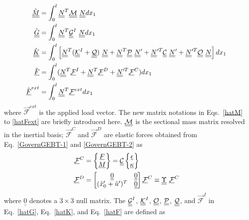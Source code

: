 \begin{align}
	\label{hatM} 
	\hat{\underline{\underline{M}}}&= \int_0^l \underline{\underline{N}}^T \mathcal{\underline{\underline{M}}} ~\underline{\underline{N}} dx_1 \\
	\label{hatG}
	\hat{\underline{\underline{G}}} &= \int_0^l \underline{\underline{N}}^T \underline{\underline{\mathcal{G}}}^I~\underline{\underline{N}} dx_1\\ 
	\label{hatK}
	\hat{\underline{\underline{K}}}&=\int_0^l \left[ \underline{\underline{N}}^T (\underline{\underline{\mathcal{K}}}^I + \mathcal{\underline{\underline{Q}}})~ \underline{\underline{N}} + \underline{\underline{N}}^T \mathcal{\underline{\underline{P}}}~ \underline{\underline{N}}^\prime + \underline{\underline{N}}^{\prime T} \mathcal{\underline{\underline{C}}}~ \underline{\underline{N}}^\prime + \underline{\underline{N}}^{\prime T} \mathcal{\underline{\underline{O}}}~ \underline{\underline{N}} \right] d x_1 \\	
	\label{hatF}
	\hat{\underline{F}} &= \int_0^l (\underline{\underline{N}}^T \underline{\mathcal{F}}^I + \underline{\underline{N}}^T \mathcal{\underline{F}}^D + \underline{\underline{N}}^{\prime T} \mathcal{\underline{F}}^C)dx_1 \\
	\label{hatFext}
	\hat{\underline{F}}^{ext}& = \int_0^l \underline{\underline{N}}^T \mathcal{\underline{F}}^{ext} dx_1 
\end{align}
where $\mathcal{\vec{F}}^{ext}$ is the applied load vector. The new matrix notations in Eqs.~\eqref{hatM} to \eqref{hatFext} are briefly
introduced here. $\mathcal{\underline{\underline{M}}}$ is the sectional mass matrix resolved
in the inertial basis; $\mathcal{\vec{F}}^C$ and $\mathcal{\vec{F}}^D$ are
elastic forces obtained from Eq.~\eqref{GovernGEBT-1} and
\eqref{GovernGEBT-2} as
\begin{align}
	\label{FC}
	\mathcal{\underline{F}}^C &= \begin{Bmatrix}
         \underline{F} \\
	\underline{M}
	\end{Bmatrix} = \underline{\underline{\mathcal{C}}} \begin{Bmatrix}
	\underline{\epsilon} \\
	\underline{\kappa}
	\end{Bmatrix} \\
	\label{FD}
	\mathcal{\underline{F}}^D & = \begin{bmatrix}
	\underline{\underline{0}} & \underline{\underline{0}}\\
	(\tilde{x}_0^\prime+\tilde{u}^\prime)^T & \underline{\underline{0}}
	\end{bmatrix}
	\mathcal{\underline{F}}^C \equiv \underline{\underline{\Upsilon}}~ \mathcal{\underline{F}}^C
\end{align}
where $\underline{\underline{0}}$ denotes a $3 \times 3$ null matrix. The $\underline{\underline{\mathcal{G}}}^I$, $\underline{\underline{\mathcal{K}}}^I$,  $\mathcal{\underline{\underline{O}}}$, $\mathcal{\underline{\underline{P}}}$, $\mathcal{\underline{\underline{Q}}}$, and $\vec{\mathcal{F}}^I$ in Eq.~\eqref{hatG}, Eq.~\eqref{hatK}, and Eq.~\eqref{hatF} are defined as
